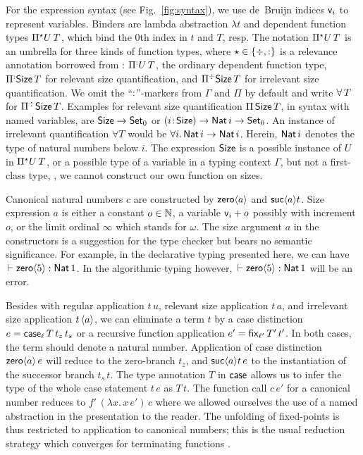 \documentclass[acmlarge,review,anonymous]{acmart}\settopmatter{printfolios=true}
\begin{document}
For the expression syntax (see Fig.~\ref{fig:syntax}), we use de~Bruijn \citeyearpar{deBruijn:nameless} indices $\ind i$ to represent variables.  Binders are lambda abstraction $\lambda t$ and dependent function types $\epiT U T$, which bind the $0$th index in $t$ and $T$, resp.  The notation $\epiT U T$ is an umbrella for three kinds of function types, where $\evar \in \{ \erased, \noterased \}$ is a relevance annotation borrowed from \citet{pfenning:intextirr}: $\erpiT[\noterased] U T$, the ordinary dependent function type, $\erpiT[\noterased] \Size T$ for relevant size quantification, and $\erpiT \Size T$ for irrelevant size quantification.
We omit the ``$\noterased$''-markers from $\Gamma$ and $\Pi$ by default and write $\forallT T$ for $\erpiT \Size T$.
%
Examples for relevant size quantification $\piT \Size T$, in syntax with named variables, are $\Size \to \Set[0]$ or $\funT i \Size \Nat i \to \Set[0]$.  An instance of irrelevant quantification $\forall T$ would be $\forall i.\, \Nat i \to \Nat i$.  Herein, $\Nat i$ denotes the type of natural numbers below $i$. The expression $\Size$ is a possible instance of $U$ in $\epiT U T$, or a possible type of a variable in a typing context $\Gamma$, but not a first-class type, \ie, we cannot construct our own function on sizes.

Canonical natural numbers $c$ are constructed by $\zero a$ and $\suc a t$.
Size expression $a$ is either a constant $o \in \NN$, a variable
$\ind i + o$ possibly with increment $o$, or the limit ordinal
$\infty$ which stands for $\omega$.  The size argument $a$ in the
constructors is a suggestion for the type checker but bears no
semantic significance.  For example, in the declarative typing
presented here, we can have $\der \zero 5 : \Nat 1$.
In the algorithmic typing however, $\der \zero 5 \jchk \Nat 1$ will be an error.

Besides with regular application $t\,u$, relevant size application $t\,a$, and irrelevant size application $t \, \ann a$,
we can eliminate a term $t$ by a case distinction $e = \case[\ell] T {t_z}{t_s}$ or a recursive function application $e' = \fix[\ell'] {T'} {t'}$.  In both cases, the term should denote a natural number.  Application of case distinction $\zero a \, e$ will reduce to the zero-branch $t_z$, and $\suc a t \,e$ to the instantiation of the successor branch $t_s\,t$.  The type annotation $T$ in $\tcase$ allows us to infer the type of the whole case statement $t\,e$ as $T\,t$.  The function call $c\,e'$ for a canonical number reduces to $f'\,(\lambda x.\,x\,e')\,c$ where we allowed ourselves the use of a named abstraction in the presentation to the reader.  The unfolding of fixed-points is thus restricted to application to canonical numbers; this is the usual reduction strategy which converges for terminating functions \cite{gimenez:typeBased}.
\end{document}
